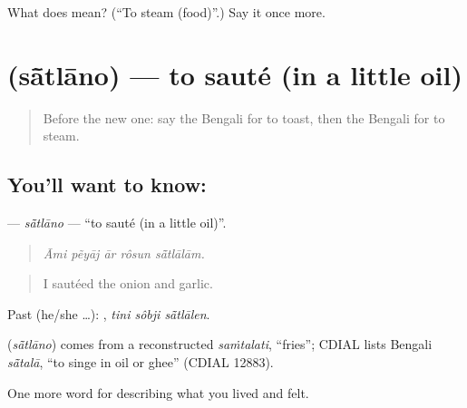 \begin{tcolorbox}[breakable,colback=teal!4,colframe=teal!35!black,title={Before you move on}]
What does  mean? (\textquotedblleft{}To steam (food)\textquotedblright{}.) Say it once more.
\end{tcolorbox}
\section[\texorpdfstring{\bn{সাঁতলানো} (sā̃tlāno)}{সাঁতলানো (sā̃tlāno)}]{ (sā̃tlāno) — to sauté (in a little oil)}

\label{lesson:BN-C514-satlano}



\begin{quote}
Before the new one: say the Bengali for to toast, then the Bengali for to steam.
\end{quote}

\subsection*{You'll want to know: }
\textbf{} — \emph{sā̃tlāno} — \textquotedblleft{}to sauté (in a little oil)\textquotedblright{}.

\begin{quote}
    
\end{quote}

\begin{quote}
\emph{Āmi pẽyāj ār rôsun sā̃tlālām.}
\end{quote}

\begin{quote}
I sautéed the onion and garlic.
\end{quote}

Past (he/she …):   , \emph{tini sôbji sā̃tlālen}.

\begin{cousinweb}
\textbf{} (\emph{sā̃tlāno}) comes from a reconstructed \emph{saṁtalati}, \textquotedblleft{}fries\textquotedblright{}; CDIAL lists Bengali \emph{sā̃talā}, \textquotedblleft{}to singe in oil or ghee\textquotedblright{} (CDIAL 12883).
\end{cousinweb}

\begin{grammarlens}[title={What you've built}]
One more word for describing what you lived and felt.
\end{grammarlens}


